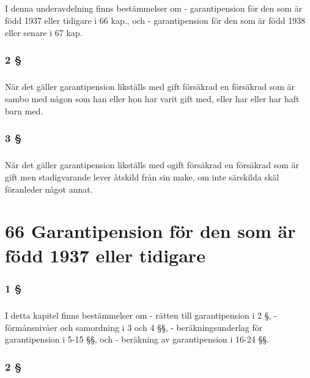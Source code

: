 \documentclass[a4paper,notitlepage,openany,10pt]{book}
\begin{document}
\paragraph*{}
I denna underavdelning finns bestämmelser om
\newline - garantipension för den som är född 1937 eller tidigare i 66 kap., och
\newline - garantipension för den som är född 1938 eller senare i 67 kap.
\subsection*{2 §}
\paragraph*{}
När det gäller garantipension likställs med gift försäkrad en försäkrad som är sambo med någon som han eller hon har varit gift med, eller har eller har haft barn med.
\subsection*{3 §}
\paragraph*{}
När det gäller garantipension likställs med ogift försäkrad en försäkrad som är gift men stadigvarande lever åtskild från sin make, om inte särskilda skäl föranleder något annat.
\chapter*{66 Garantipension för den som är född 1937 eller tidigare}
\subsection*{1 §}
\paragraph*{}
I detta kapitel finns bestämmelser om
\newline - rätten till garantipension i 2 §,
\newline - förmånsnivåer och samordning i 3 och 4 §§,
\newline - beräkningsunderlag för garantipension i 5-15 §§, och
\newline - beräkning av garantipension i 16-24 §§.
\subsection*{2 §}
\end{document}
